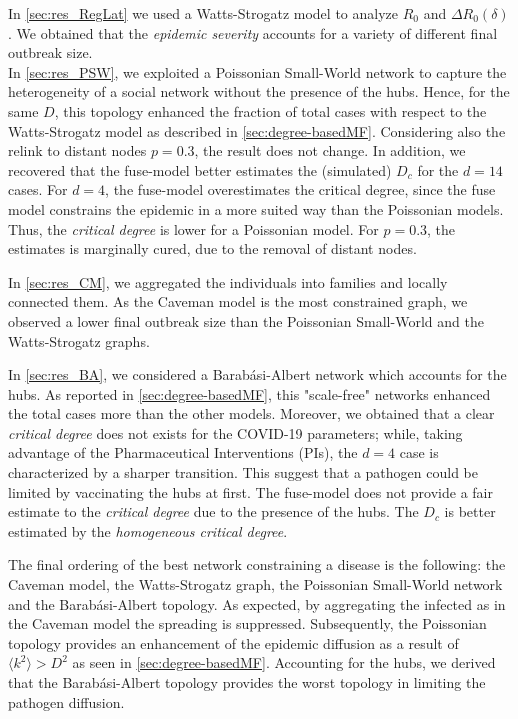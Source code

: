 \documentclass[a4paper,10pt, oneside]{book} %
\theoremstyle{definition}
\begin{document}
In \autoref{sec:res_RegLat} we used a Watts-Strogatz model to analyze $ R_0$ and $ \Delta R_0 (\delta)$. We obtained that the \textit{epidemic severity} accounts for a variety of different final outbreak size.\\
In \autoref{sec:res_PSW}, we exploited a Poissonian Small-World network to capture the heterogeneity of a social network without the presence of the hubs. Hence, for the same $ D$, this topology enhanced the fraction of total cases with respect to the Watts-Strogatz model as described in \autoref{sec:degree-basedMF}. 
Considering also the relink to distant nodes $ p = 0.3$, the result does not change.
In addition, we recovered that the fuse-model better estimates the (simulated) $ D_c$ for the $ d = 14$ cases. For $d=4$, the fuse-model overestimates the critical degree, since the fuse model constrains the epidemic in a more suited way than the Poissonian models. Thus, the \textit{critical degree} is lower for a Poissonian model. For $ p = 0.3$, the estimates is marginally cured, due to the removal of distant nodes. 

In \autoref{sec:res_CM}, we aggregated the individuals into families and locally connected them.
As the Caveman model is the most constrained graph, we observed a lower final outbreak size than the Poissonian Small-World and the Watts-Strogatz graphs.

In \autoref{sec:res_BA}, we considered a Barabási-Albert network which accounts for the hubs. As reported in \autoref{sec:degree-basedMF}, this "scale-free" networks enhanced the total cases more than the other models. 
Moreover, we obtained that a clear \textit{critical degree} does not exists for the COVID-19 parameters; while, taking advantage of the Pharmaceutical Interventions (PIs), the $d = 4$ case is characterized by a sharper transition. This suggest that a pathogen could be limited by vaccinating the hubs at first.
The fuse-model does not provide a fair estimate to the \textit{critical degree} due to the presence of the hubs. The $ D_c$ is better estimated by the \textit{homogeneous critical degree}. 

The final ordering of the best network constraining a disease is the following: the Caveman model, the Watts-Strogatz graph, the Poissonian Small-World network and the Barabási-Albert topology. As expected, by aggregating the infected as in the Caveman model the spreading is suppressed. Subsequently, the Poissonian topology provides an enhancement of the epidemic diffusion as a result of $ \langle k^2 \rangle > D^{2}$ as seen in \autoref{sec:degree-basedMF}. Accounting for the hubs, we derived that the Barabási-Albert topology provides the worst topology in limiting the pathogen diffusion.
\end{document}
